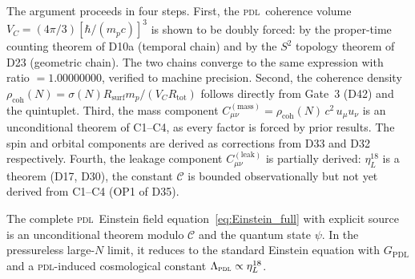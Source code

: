 \documentclass[12pt,a4paper]{article}
\newcommand{\hb}{\hbar}
\newcommand{\PDL}{\textsc{pdl}}
\newcommand{\Cmass}{C^{(\mathrm{mass})}}
\newcommand{\Cleak}{C^{(\mathrm{leak})}}
\newcommand{\rhocoh}{\rho_{\mathrm{coh}}}
\newcommand{\sig}{\sigma}
\newcommand{\Rsurf}{R_{\mathrm{surf}}}
\newcommand{\Rtot}{R_{\mathrm{tot}}}
\newcommand{\VC}{V_C}
\newcommand{\etaL}{\eta_L}
\begin{document}
The argument proceeds in four steps. First, the \PDL\ coherence volume $\VC = (4\pi/3)[\hb/(m_p c)]^3$ is shown to be doubly forced: by the proper-time counting theorem of D10a (temporal chain) and by the $S^2$ topology theorem of D23 (geometric chain). The two chains converge to the same expression with ratio $= 1.00000000$, verified to machine precision. Second, the coherence density $\rhocoh(N) = \sig(N)\Rsurf m_p/(\VC\Rtot)$ follows directly from Gate~3 (D42) and the quintuplet. Third, the mass component $\Cmass_{\mu\nu} = \rhocoh(N)\,c^2\,u_\mu u_\nu$ is an unconditional theorem of C1--C4, as every factor is forced by prior results. The spin and orbital components are derived as corrections from D33 and D32 respectively. Fourth, the leakage component $\Cleak_{\mu\nu}$ is partially derived: $\etaL^{18}$ is a theorem (D17, D30), the constant $\mathcal{C}$ is bounded observationally but not yet derived from C1--C4 (OP1 of D35).

The complete \PDL\ Einstein field equation~\eqref{eq:Einstein_full} with explicit source is an unconditional theorem modulo $\mathcal{C}$ and the quantum state $\psi$. In the pressureless large-$N$ limit, it reduces to the standard Einstein equation with $G_{\mathrm{PDL}}$ and a \PDL-induced cosmological constant $\Lambda_{\PDL} \propto \etaL^{18}$.

\clearpage



\end{document}
